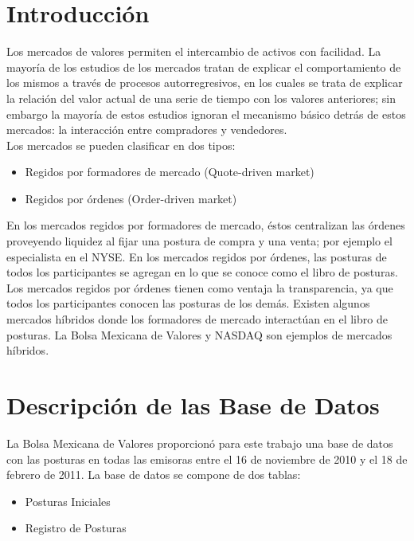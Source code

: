 \documentclass[11pt]{article}
\numberwithin{equation}{section} %
\begin{document}
\thispagestyle{empty}
\tableofcontents
\clearpage

\setcounter{page}{1}

\section{Introducción}

Los mercados de valores permiten el intercambio de activos con facilidad. La mayoría de los estudios de los mercados tratan de explicar el comportamiento de los mismos a través de procesos autorregresivos, en los cuales se trata de explicar la relación del valor actual de una serie de tiempo con los valores anteriores; sin embargo la mayoría de estos estudios ignoran el mecanismo básico detrás de estos mercados: la interacción entre compradores y vendedores.\\

Los mercados se pueden clasificar en dos tipos:
\begin{itemize}
  \item Regidos por formadores de mercado (Quote-driven market)
  \item Regidos por órdenes (Order-driven market)
\end{itemize}

En los mercados regidos por formadores de mercado, éstos centralizan las órdenes proveyendo liquidez al fijar una postura de compra y una venta; por ejemplo el especialista en el NYSE. En los mercados regidos por órdenes, las posturas de todos los participantes se agregan en lo que se conoce como el libro de posturas. Los mercados regidos por órdenes tienen como ventaja la transparencia, ya que todos los participantes conocen las posturas de los demás. Existen algunos mercados híbridos donde los formadores de mercado interactúan en el libro de posturas. La Bolsa Mexicana de Valores y NASDAQ son ejemplos de mercados híbridos.

\clearpage

\section{Descripción de las Base de Datos}
La Bolsa Mexicana de Valores proporcionó para este trabajo una base de datos con las posturas en todas las emisoras entre el 16 de noviembre de 2010 y el 18 de febrero de 2011. La base de datos se compone de dos tablas:

\begin{itemize}
  \item Posturas Iniciales
  \item Registro de Posturas
\end{itemize}
\end{document}
